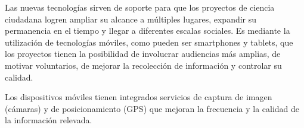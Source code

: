 	
		
	Las nuevas tecnologías sirven de soporte para que los proyectos de ciencia ciudadana logren ampliar su alcance a múltiples lugares, expandir su permanencia en el tiempo y llegar a diferentes escalas sociales. Es mediante la utilización de tecnologías móviles, como pueden ser smartphones y tablets, que los proyectos tienen la posibilidad de involucrar audiencias más amplias, de motivar voluntarios, de mejorar la recolección de información y controlar su calidad.\cite{newman2012future}
	
	

	Los dispositivos móviles tienen integrados servicios de captura de imagen (cámaras) y de posicionamiento (GPS) que mejoran la frecuencia y la calidad de la información relevada.\cite{newman2012future}
	

	
	
	
	


